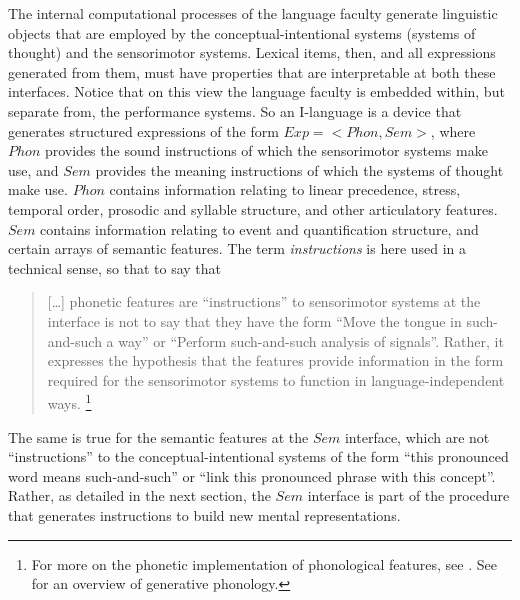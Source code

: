 The internal computational processes of the language faculty generate linguistic objects that are employed by the conceptual-intentional systems (systems of thought) and the sensorimotor systems. Lexical items, then, and all expressions generated from them, must have properties that are interpretable at both these interfaces. Notice that on this view the language faculty is embedded within, but separate from, the performance systems. So an I-language is a device that generates structured expressions of the form $Exp = <Phon,Sem>$, where $Phon$ provides the sound instructions of which the sensorimotor systems make use, and $Sem$ provides the meaning instructions of which the systems of thought make use. $Phon$ contains information relating to linear precedence, stress, temporal order, prosodic and syllable structure, and other articulatory features. $Sem$ contains information relating to event and quantification structure, and certain arrays of semantic features. The term \textit{instructions} is here used in a technical sense, so that to say that

\begin{quote}
    […] phonetic features are “instructions” to sensorimotor systems at the interface is not to say that they have the form “Move the tongue in such-and-such a way” or “Perform such-and-such analysis of signals”. Rather, it expresses the hypothesis that the features provide information in the form required for the sensorimotor systems to function in language-independent ways. \citep[91]{Chomsky2000a}\footnote{For more on the phonetic implementation of phonological features, see \citet{Halle1983,Halle1995}. See \citet{Kenstowicz1994,HaleReiss2008,VolenecReiss2020} for an overview of generative phonology.}
\end{quote}

The same is true for the semantic features at the $Sem$ interface, which are not “instructions” to the conceptual-intentional systems of the form “this pronounced word means such-and-such” or “link this pronounced phrase with this concept”. Rather, as detailed in the next section, the $Sem$ interface is part of the procedure that generates instructions to build new mental representations.


